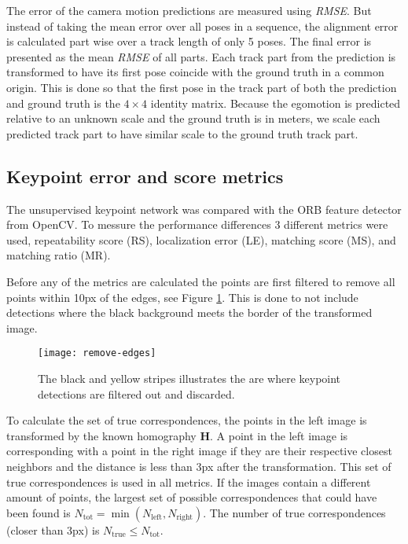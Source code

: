 The error of the camera motion predictions are measured using \textit{RMSE}. But instead of taking the mean error over all poses in a sequence, the alignment error is calculated part wise over a track length of only 5 poses. The final error is presented as the mean \textit{RMSE} of all parts. Each track part from the prediction is transformed to have its first pose coincide with the ground truth in a common origin. This is done so that the first pose in the track part of both the prediction and ground truth is the ${4\times 4}$ identity matrix. Because the egomotion is predicted relative to an unknown scale and the ground truth is in meters, we scale each predicted track part to have similar scale to the ground truth track part.

\subsection{Keypoint error and score metrics}\label{sec:keypointmetrics}

The unsupervised keypoint network was compared with the ORB feature detector from OpenCV. To messure the performance differences 3 different metrics were used, repeatability score (RS), localization error (LE), matching score (MS), and matching ratio (MR).

Before any of the metrics are calculated the points are first filtered to remove all points within 10px of the edges, see Figure \ref{fig:remove-edges}. This is done to not include detections where the black background meets the border of the transformed image.

\begin{figure}[H]
	\centering
	\texttt{[image: remove-edges]}
	\caption{The black and yellow stripes illustrates the are where keypoint detections are filtered out and discarded.}
	\label{fig:remove-edges}
\end{figure}

To calculate the set of true correspondences, the points in the left image is transformed by the known homography $\textbf{H}$. A point in the left image is corresponding with a point in the right image if they are their respective closest neighbors and the distance is less than 3px after the transformation. This set of true correspondences is used in all metrics. If the images contain a different amount of points, the largest set of possible correspondences that could have been found is $N_{\mathrm{tot}} = \min(N_{\mathrm{left}}, N_{\mathrm{right}})$. The number of true correspondences (closer than 3px) is $N_{\mathrm{true}} \le N_{\mathrm{tot}}$.

